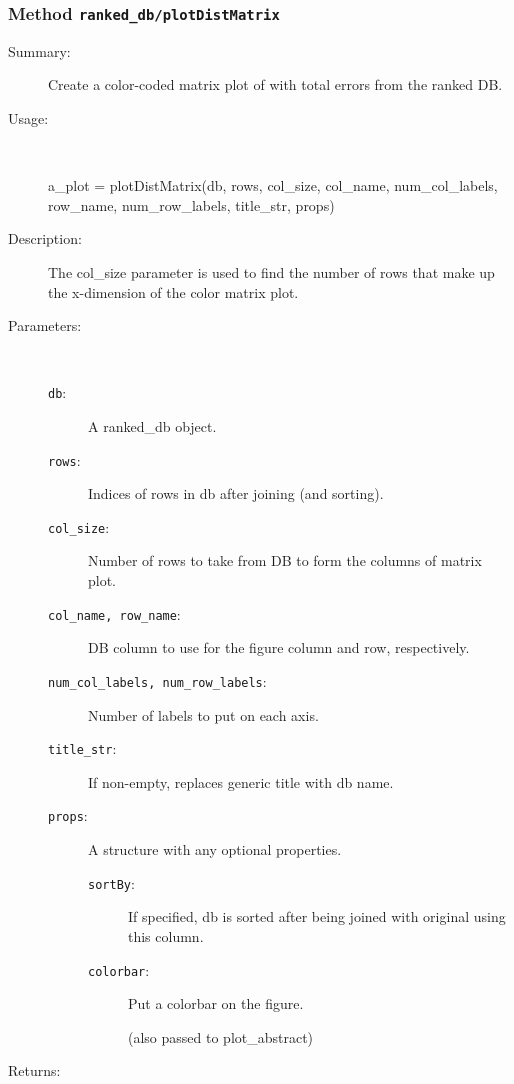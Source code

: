 \subsubsection[Method \texttt{plotDistMatrix}]{Method \texttt{ranked\_db/plotDistMatrix}}%
%
\label{ref_ranked_db__plotDistMatrix}%
\hypertarget{ref_ranked_db__plotDistMatrix}{}%
\begin{description}
\item[Summary:]Create a color-coded matrix plot of with total errors from the ranked DB.
%
\item[Usage:]~%
\begin{lyxcode}%
a\_plot = plotDistMatrix(db, rows, col\_size, col\_name, num\_col\_labels, 
			  row\_name, num\_row\_labels, title\_str, props)
%
\end{lyxcode}%
%
\item[Description:]%
The col\_size parameter is used to find the number of rows that make up the 
 x-dimension of the color matrix plot.
\item[Parameters:]~
\begin{description}%
\item[\texttt{db}:]
 A ranked\_db object.
\item[\texttt{rows}:]
 Indices of rows in db after joining (and sorting).
\item[\texttt{col\_size}:]
 Number of rows to take from DB to form the columns of matrix plot.
\item[\texttt{col\_name, row\_name}:]
 DB column to use for the figure column and row, respectively.
\item[\texttt{num\_col\_labels, num\_row\_labels}:]
 Number of labels to put on each axis.
\item[\texttt{title\_str}:]
 If non-empty, replaces generic title with db name. 
\item[\texttt{props}:]
 A structure with any optional properties.
\begin{description}%
\item[\texttt{sortBy}:]
 If specified, db is sorted after being joined with original using this column.
\item[\texttt{colorbar}:]
 Put a colorbar on the figure.

(also passed to plot\_abstract)
\end{description}%
\end{description}%
%
\item[Returns:
]~


\end{description}
